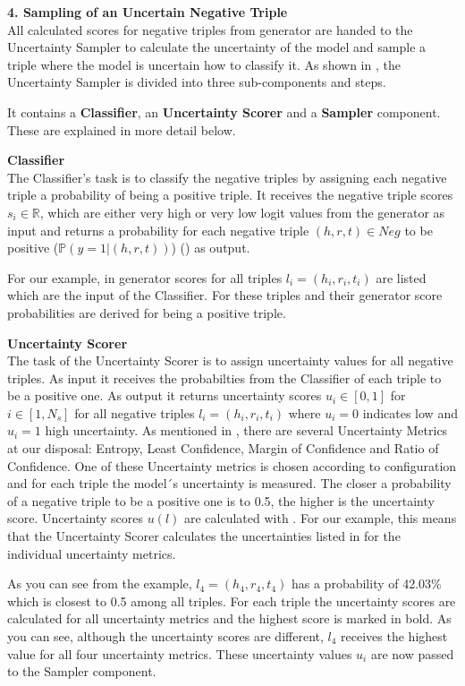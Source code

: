 \textbf{4. Sampling of an Uncertain Negative Triple}\\

All calculated scores for negative triples from generator are handed to the Uncertainty Sampler to calculate the uncertainty of the model and sample a triple where the model is uncertain how to classify it.
As shown in , the Uncertainty Sampler is divided into three sub-components and steps.

It contains a \textbf{Classifier}, an \textbf{Uncertainty Scorer} and a \textbf{Sampler} component.
These are explained in more detail below.

\textbf{Classifier} \\
The Classifier's task is to classify the negative triples by assigning each negative triple a probability of being a positive triple.
It receives the negative triple scores $s_i \in \mathbb{R}$, which are either very high or very low logit values from the generator as input and returns a probability for each negative triple $(h,r,t) \in Neg$ to be positive  ($\mathbb{P}(y = 1| (h,r,t))$) () as output. 

For our example, in  generator scores for all triples $l_i = (h_i, r_i, t_i)$ are listed which are the input of the Classifier.
For these triples and their generator score probabilities are derived for being a positive triple.



\textbf{Uncertainty Scorer} \\
The task of the Uncertainty Scorer is to assign uncertainty values for all negative triples.
As input it receives the probabilties from the Classifier of each triple to be a positive one.
As output it returns uncertainty scores $u_i \in [0,1]$ for $i \in [1, N_s]$ for all negative triples $l_i = (h_i, r_i, t_i)$ where $u_i = 0$ indicates low and $u_i = 1$ high uncertainty.
As mentioned in ,  there are several Uncertainty Metrics at our disposal:
Entropy, Least Confidence, Margin of Confidence and Ratio of Confidence.
One of these Uncertainty metrics is chosen according to configuration and for each triple the model´s uncertainty is measured.
The closer a probability of a negative triple to be a positive one is to 0.5, the higher is the uncertainty score. 
Uncertainty scores $u(l)$ are calculated with .
For our example, this means that the Uncertainty Scorer calculates the uncertainties listed in  for the individual uncertainty metrics.

As you can see from the example, $l_4 = (h_4, r_4, t_4)$ has a probability of 42.03\% which is closest to 0.5 among all triples.
For each triple the uncertainty scores are calculated for all uncertainty metrics and the highest score is marked in bold.
As you can see, although the uncertainty scores are different, $l_4$ receives the highest value for all four uncertainty metrics.
These uncertainty values $u_i$ are now passed to the Sampler component.


